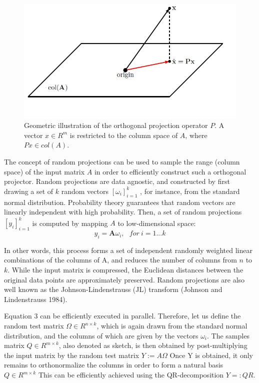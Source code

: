 \documentclass[a4paper,10pt]{article}
\begin{document}
\begin{figure}
	\includegraphics[scale=0.5]{fig2.jpg}
	\caption{Geometric illustration of the orthogonal projection operator $P$. A vector $x \in R^m$ is restricted to the column space of $A$, where $Px \in col(A)$.}
	\label{fig2}
\end{figure}


The concept of random projections can be used to sample the range (column space) of the input matrix $A$ in order to efficiently construct such a orthogonal projector. Random projections are data agnostic, and constructed by first drawing a set of $k$ random vectors ${[\omega_i]}_{i =1} ^{k}$ , for instance, from the standard normal distribution. Probability theory guarantees that random vectors are linearly independent with high probability. Then, a set of random projections ${[y_i]}_{i =1} ^{k}$ is computed by mapping $A$ to low-dimensional space:
\begin{equation}\label{eq1}
y_i = \mathbf{A}\omega _i,\ \ \ for\ i = 1...k
\end{equation}

In other words, this process forms a set of independent randomly weighted linear combinations of the columns of A, and reduces the number of columns from $n$ to $k$. While the input matrix is compressed, the Euclidean distances between the original data points are approximately preserved. Random projections are also well known as the Johnson-Lindenstrauss (JL) transform (Johnson and Lindenstrauss 1984).

Equation 3 can be efficiently executed in parallel. Therefore, let us define the random test matrix $\Omega \in R^{n \times k}$, which is again drawn from the standard normal distribution, and the columns of which are given by the vectors $\omega_i$. The samples matrix $Q \in R^{m \times k}$, also denoted as sketch, is then obtained by post-multiplying the input matrix by the random test matrix $ Y := A\Omega $
Once Y is obtained, it only remains to orthonormalize the columns in order to form a natural basis $Q \in R^{m \times k}$ This can be efficiently achieved using the QR-decomposition $Y =: QR$. 
\end{document}
